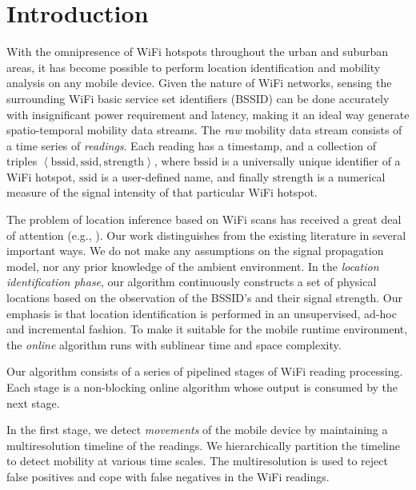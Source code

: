 \section{Introduction}

With the omnipresence of WiFi hotspots throughout the urban and suburban areas, it has become possible to perform location identification and
mobility analysis on any mobile device.  Given the nature of WiFi networks,
sensing the surrounding WiFi basic service set identifiers (BSSID) can be done
accurately with insignificant power requirement and latency, making it an ideal
way generate spatio-temporal mobility data streams.  The {\em raw} mobility data
stream consists of a time series of {\em readings}.  Each reading has a
timestamp, and a collection of triples $\left<\mathrm{bssid}, \mathrm{ssid},
\mathrm{strength}\right>$, where $\mathrm{bssid}$ is a universally unique
identifier of a WiFi hotspot, $\mathrm{ssid}$ is a user-defined name, and
finally $\mathrm{strength}$ is a numerical measure of the signal intensity of that particular WiFi hotspot.


The problem of location inference based on WiFi scans has received a great deal
of attention (e.g., \cite{feng2012received,hatami2005comparative,
kushki2007kernel,liu2005signal,paul2008wi,
letchner2005large}).  Our work distinguishes from the existing
literature in several important ways.  We do not make any assumptions on the signal
propagation model, nor any prior knowledge of the ambient environment.  In the
{\em location identification phase}, our
algorithm continuously constructs a set of physical locations based on the
observation of the BSSID's and their signal strength.  Our emphasis is that
location identification is performed in an unsupervised, ad-hoc and incremental
fashion.  To make it suitable for the mobile runtime environment, the {\em
online} algorithm runs with sublinear time and space complexity.


Our algorithm consists of a series of pipelined stages of WiFi reading
processing.  Each stage is a non-blocking online algorithm whose output is
consumed by the next stage.  


In the first stage, we detect {\em movements}
of the mobile device by maintaining a multiresolution timeline of the readings.  We
hierarchically partition the timeline to detect mobility at various time scales.
The multiresolution is used to reject false positives and cope with false
negatives in the WiFi readings.

